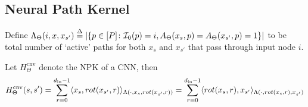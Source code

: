 \subsection{Neural Path Kernel}
\begin{definition}\label{def:cnnlambda}
Define $\Lambda_{\Theta}(i,x,x_{s'}) \stackrel{\Delta}{=} \left|\{p\in[P]\colon  \mathcal{I}_0(p)=i, A_{\Theta}(x_s,p)= A_{\Theta}(x_{s'},p)=1\}\right|$ to be total number of `active' paths for both $x_s$ and $x_{s'}$ that pass through input node $i$.
\end{definition}

\begin{lemma}\label{lm:cnnnpk}
Let $H^{\text{cnv}}_{\Theta}$ denote the NPK of a CNN, then 
\begin{align*}
H^{\text{cnv}}_{\Theta}(s,s')=\sum_{r=0}^{d_{\text{in}}-1} \langle x_s,rot(x_{s'},r)\rangle_{\Lambda(\cdot, x_s,rot(x_{s'},r))}=\sum_{r=0}^{d_{\text{in}}-1} \langle rot(x_s,r),x_{s'}\rangle_{\Lambda(\cdot, rot(x_s,r),x_{s'})}
\end{align*}
\end{lemma}


